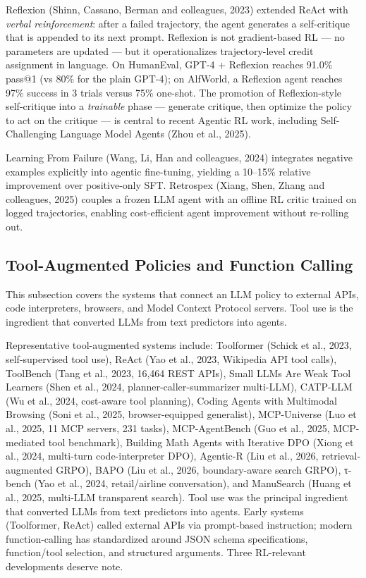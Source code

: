Reflexion (Shinn, Cassano, Berman and colleagues, 2023) extended ReAct with \emph{verbal reinforcement}: after a failed trajectory, the agent generates a self-critique that is appended to its next prompt. Reflexion is not gradient-based RL --- no parameters are updated --- but it operationalizes trajectory-level credit assignment in language. On HumanEval, GPT-4 + Reflexion reaches 91.0\% pass@1 (vs 80\% for the plain GPT-4); on AlfWorld, a Reflexion agent reaches 97\% success in 3 trials versus 75\% one-shot. The promotion of Reflexion-style self-critique into a \emph{trainable} phase --- generate critique, then optimize the policy to act on the critique --- is central to recent Agentic RL work, including Self-Challenging Language Model Agents (Zhou et al., 2025).

Learning From Failure (Wang, Li, Han and colleagues, 2024) integrates negative examples explicitly into agentic fine-tuning, yielding a 10--15\% relative improvement over positive-only SFT. Retrospex (Xiang, Shen, Zhang and colleagues, 2025) couples a frozen LLM agent with an offline RL critic trained on logged trajectories, enabling cost-efficient agent improvement without re-rolling out.

\subsection{Tool-Augmented Policies and Function Calling}\label{tool-augmented-policies-and-function-calling}

This subsection covers the systems that connect an LLM policy to external APIs, code interpreters, browsers, and Model Context Protocol servers. Tool use is the ingredient that converted LLMs from text predictors into agents.

Representative tool-augmented systems include: Toolformer (Schick et al., 2023, self-supervised tool use), ReAct (Yao et al., 2023, Wikipedia API tool calls), ToolBench (Tang et al., 2023, 16,464 REST APIs), Small LLMs Are Weak Tool Learners (Shen et al., 2024, planner-caller-summarizer multi-LLM), CATP-LLM (Wu et al., 2024, cost-aware tool planning), Coding Agents with Multimodal Browsing (Soni et al., 2025, browser-equipped generalist), MCP-Universe (Luo et al., 2025, 11 MCP servers, 231 tasks), MCP-AgentBench (Guo et al., 2025, MCP-mediated tool benchmark), Building Math Agents with Iterative DPO (Xiong et al., 2024, multi-turn code-interpreter DPO), Agentic-R (Liu et al., 2026, retrieval-augmented GRPO), BAPO (Liu et al., 2026, boundary-aware search GRPO), τ-bench (Yao et al., 2024, retail/airline conversation), and ManuSearch (Huang et al., 2025, multi-LLM transparent search). Tool use was the principal ingredient that converted LLMs from text predictors into agents. Early systems (Toolformer, ReAct) called external APIs via prompt-based instruction; modern function-calling has standardized around JSON schema specifications, function/tool selection, and structured arguments. Three RL-relevant developments deserve note.

